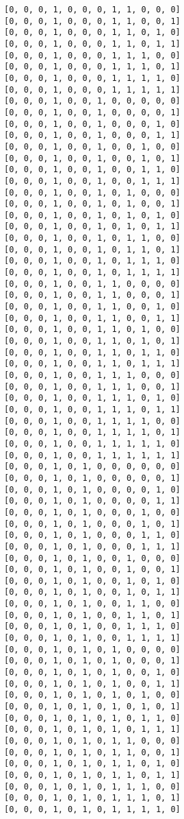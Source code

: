 \documentclass[11pt]{article}
\begin{document}
\begin{Verbatim}[commandchars=\\\{\}]
[0, 0, 0, 1, 0, 0, 0, 1, 1, 0, 0, 0]
[0, 0, 0, 1, 0, 0, 0, 1, 1, 0, 0, 1]
[0, 0, 0, 1, 0, 0, 0, 1, 1, 0, 1, 0]
[0, 0, 0, 1, 0, 0, 0, 1, 1, 0, 1, 1]
[0, 0, 0, 1, 0, 0, 0, 1, 1, 1, 0, 0]
[0, 0, 0, 1, 0, 0, 0, 1, 1, 1, 0, 1]
[0, 0, 0, 1, 0, 0, 0, 1, 1, 1, 1, 0]
[0, 0, 0, 1, 0, 0, 0, 1, 1, 1, 1, 1]
[0, 0, 0, 1, 0, 0, 1, 0, 0, 0, 0, 0]
[0, 0, 0, 1, 0, 0, 1, 0, 0, 0, 0, 1]
[0, 0, 0, 1, 0, 0, 1, 0, 0, 0, 1, 0]
[0, 0, 0, 1, 0, 0, 1, 0, 0, 0, 1, 1]
[0, 0, 0, 1, 0, 0, 1, 0, 0, 1, 0, 0]
[0, 0, 0, 1, 0, 0, 1, 0, 0, 1, 0, 1]
[0, 0, 0, 1, 0, 0, 1, 0, 0, 1, 1, 0]
[0, 0, 0, 1, 0, 0, 1, 0, 0, 1, 1, 1]
[0, 0, 0, 1, 0, 0, 1, 0, 1, 0, 0, 0]
[0, 0, 0, 1, 0, 0, 1, 0, 1, 0, 0, 1]
[0, 0, 0, 1, 0, 0, 1, 0, 1, 0, 1, 0]
[0, 0, 0, 1, 0, 0, 1, 0, 1, 0, 1, 1]
[0, 0, 0, 1, 0, 0, 1, 0, 1, 1, 0, 0]
[0, 0, 0, 1, 0, 0, 1, 0, 1, 1, 0, 1]
[0, 0, 0, 1, 0, 0, 1, 0, 1, 1, 1, 0]
[0, 0, 0, 1, 0, 0, 1, 0, 1, 1, 1, 1]
[0, 0, 0, 1, 0, 0, 1, 1, 0, 0, 0, 0]
[0, 0, 0, 1, 0, 0, 1, 1, 0, 0, 0, 1]
[0, 0, 0, 1, 0, 0, 1, 1, 0, 0, 1, 0]
[0, 0, 0, 1, 0, 0, 1, 1, 0, 0, 1, 1]
[0, 0, 0, 1, 0, 0, 1, 1, 0, 1, 0, 0]
[0, 0, 0, 1, 0, 0, 1, 1, 0, 1, 0, 1]
[0, 0, 0, 1, 0, 0, 1, 1, 0, 1, 1, 0]
[0, 0, 0, 1, 0, 0, 1, 1, 0, 1, 1, 1]
[0, 0, 0, 1, 0, 0, 1, 1, 1, 0, 0, 0]
[0, 0, 0, 1, 0, 0, 1, 1, 1, 0, 0, 1]
[0, 0, 0, 1, 0, 0, 1, 1, 1, 0, 1, 0]
[0, 0, 0, 1, 0, 0, 1, 1, 1, 0, 1, 1]
[0, 0, 0, 1, 0, 0, 1, 1, 1, 1, 0, 0]
[0, 0, 0, 1, 0, 0, 1, 1, 1, 1, 0, 1]
[0, 0, 0, 1, 0, 0, 1, 1, 1, 1, 1, 0]
[0, 0, 0, 1, 0, 0, 1, 1, 1, 1, 1, 1]
[0, 0, 0, 1, 0, 1, 0, 0, 0, 0, 0, 0]
[0, 0, 0, 1, 0, 1, 0, 0, 0, 0, 0, 1]
[0, 0, 0, 1, 0, 1, 0, 0, 0, 0, 1, 0]
[0, 0, 0, 1, 0, 1, 0, 0, 0, 0, 1, 1]
[0, 0, 0, 1, 0, 1, 0, 0, 0, 1, 0, 0]
[0, 0, 0, 1, 0, 1, 0, 0, 0, 1, 0, 1]
[0, 0, 0, 1, 0, 1, 0, 0, 0, 1, 1, 0]
[0, 0, 0, 1, 0, 1, 0, 0, 0, 1, 1, 1]
[0, 0, 0, 1, 0, 1, 0, 0, 1, 0, 0, 0]
[0, 0, 0, 1, 0, 1, 0, 0, 1, 0, 0, 1]
[0, 0, 0, 1, 0, 1, 0, 0, 1, 0, 1, 0]
[0, 0, 0, 1, 0, 1, 0, 0, 1, 0, 1, 1]
[0, 0, 0, 1, 0, 1, 0, 0, 1, 1, 0, 0]
[0, 0, 0, 1, 0, 1, 0, 0, 1, 1, 0, 1]
[0, 0, 0, 1, 0, 1, 0, 0, 1, 1, 1, 0]
[0, 0, 0, 1, 0, 1, 0, 0, 1, 1, 1, 1]
[0, 0, 0, 1, 0, 1, 0, 1, 0, 0, 0, 0]
[0, 0, 0, 1, 0, 1, 0, 1, 0, 0, 0, 1]
[0, 0, 0, 1, 0, 1, 0, 1, 0, 0, 1, 0]
[0, 0, 0, 1, 0, 1, 0, 1, 0, 0, 1, 1]
[0, 0, 0, 1, 0, 1, 0, 1, 0, 1, 0, 0]
[0, 0, 0, 1, 0, 1, 0, 1, 0, 1, 0, 1]
[0, 0, 0, 1, 0, 1, 0, 1, 0, 1, 1, 0]
[0, 0, 0, 1, 0, 1, 0, 1, 0, 1, 1, 1]
[0, 0, 0, 1, 0, 1, 0, 1, 1, 0, 0, 0]
[0, 0, 0, 1, 0, 1, 0, 1, 1, 0, 0, 1]
[0, 0, 0, 1, 0, 1, 0, 1, 1, 0, 1, 0]
[0, 0, 0, 1, 0, 1, 0, 1, 1, 0, 1, 1]
[0, 0, 0, 1, 0, 1, 0, 1, 1, 1, 0, 0]
[0, 0, 0, 1, 0, 1, 0, 1, 1, 1, 0, 1]
[0, 0, 0, 1, 0, 1, 0, 1, 1, 1, 1, 0]

\end{Verbatim}
\end{document}
